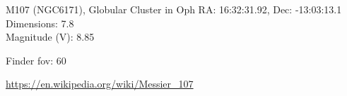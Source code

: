 \begin{block}{M107 (NGC6171), Globular Cluster in Oph}
    RA: 16:32:31.92, Dec: -13:03:13.1 \\ 
    Dimensions: 7.8 \\ 
    Magnitude (V): 8.85



    Finder fov: 60 

    \url{https://en.wikipedia.org/wiki/Messier_107} 
\end{block}
